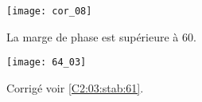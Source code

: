 \ifprof

\begin{center}
\texttt{[image: cor\_08]}
\end{center}

La marge de phase est supérieure à 60\degres.

\else
\fi


\ifprof
\else
\begin{center}
\texttt{[image: 64\_03]}
\end{center}
\fi


 

\ifprof
\else
%

\begin{flushright}
\footnotesize{Corrigé  voir \ref{C2:03:stab:61}.}
\end{flushright}%
\fi